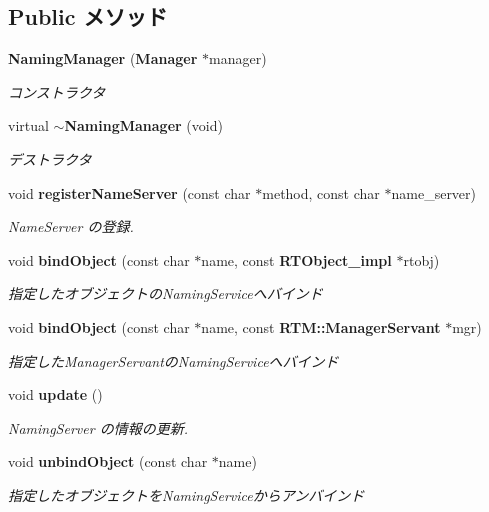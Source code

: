 \subsection*{Public メソッド}
\begin{DoxyCompactItemize}
\item 
{\bf NamingManager} ({\bf Manager} $\ast$manager)
\begin{DoxyCompactList}\small\item\em コンストラクタ \item\end{DoxyCompactList}\item 
virtual {\bf $\sim$NamingManager} (void)
\begin{DoxyCompactList}\small\item\em デストラクタ \item\end{DoxyCompactList}\item 
void {\bf registerNameServer} (const char $\ast$method, const char $\ast$name\_\-server)
\begin{DoxyCompactList}\small\item\em NameServer の登録. \item\end{DoxyCompactList}\item 
void {\bf bindObject} (const char $\ast$name, const {\bf RTObject\_\-impl} $\ast$rtobj)
\begin{DoxyCompactList}\small\item\em 指定したオブジェクトのNamingServiceへバインド \item\end{DoxyCompactList}\item 
void {\bf bindObject} (const char $\ast$name, const {\bf RTM::ManagerServant} $\ast$mgr)
\begin{DoxyCompactList}\small\item\em 指定したManagerServantのNamingServiceへバインド \item\end{DoxyCompactList}\item 
void {\bf update} ()
\begin{DoxyCompactList}\small\item\em NamingServer の情報の更新. \item\end{DoxyCompactList}\item 
void {\bf unbindObject} (const char $\ast$name)
\begin{DoxyCompactList}\small\item\em 指定したオブジェクトをNamingServiceからアンバインド \item\end{DoxyCompactList}\item 

\end{DoxyCompactItemize}
